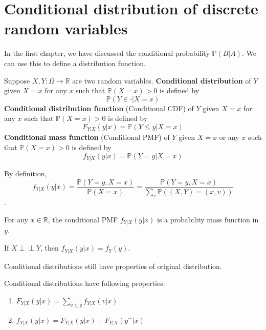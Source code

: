 \documentclass{huhtakm-template-book}
\newcommand{\independent}{\perp\!\!\!\perp}
\newcommand{\prob}{\mathbb{P}}
\begin{document}
\section{Conditional distribution of discrete random variables}
    In the first chapter, we have discussed the conditional probability $\prob(B|A)$. We can use this to define a distribution function.
    \begin{defn}
        Suppose $X,Y:\Omega\to\mathbb{R}$ are two random variables. \textbf{Conditional distribution} of $Y$ given $X=x$ for any $x$ such that $\prob(X=x)>0$ is defined by
        \begin{equation*}
            \prob(Y\in \cdot|X=x)
        \end{equation*}
        \textbf{Conditional distribution function} (Conditional CDF) of $Y$ given $X=x$ for any $x$ such that $\prob(X=x)>0$ is defined by
        \begin{equation*}
            F_{Y|X}(y|x)=\prob(Y\leq y|X=x)
        \end{equation*}
        \textbf{Conditional mass function} (Conditional PMF) of $Y$ given $X=x$ or any $x$ such that $\prob(X=x)>0$ is defined by
        \begin{equation*}
            f_{Y|X}(y|x)=\prob(Y=y|X=x)
        \end{equation*}
    \end{defn}
    \begin{rem}
        By definition, 
        \begin{equation*}
            f_{Y|X}(y|x)=\frac{\prob(Y=y,X=x)}{\prob(X=x)}=\frac{\prob(Y=y,X=x)}{\sum_{v}\prob((X,Y)=(x,v))}
        \end{equation*}.
    \end{rem}
    \begin{rem}
        For any $x\in\mathbb{R}$, the conditional PMF $f_{Y|X}(y|x)$ is a probability mass function in $y$.
    \end{rem}
    \begin{rem}
        If $X\independent Y$, then $f_{Y|X}(y|x)=f_{Y}(y)$.
    \end{rem}
    Conditional distributions still have properties of original distribution.
    \begin{lem}
        Conditional distributions have following properties:
        \begin{enumerate}
            \item $F_{Y|X}(y|x)=\sum_{v\leq y}f_{Y|X}(v|x)$
            \item $f_{Y|X}(y|x)=F_{Y|X}(y|x)-F_{Y|X}(y^{-}|x)$
        \end{enumerate}
    \end{lem}
\end{document}

